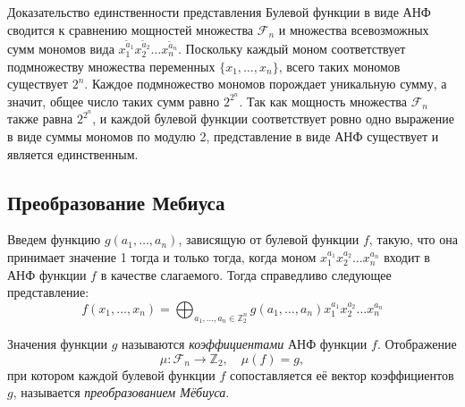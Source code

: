Доказательство единственности представления Булевой функции в виде АНФ сводится к сравнению мощностей множества $\mathcal{F}_n$ и множества всевозможных сумм мономов вида $x_1^{\tilde{a}_1}x_2^{\tilde{a}_2}\dots x_n^{\tilde{a}_n}$. Поскольку каждый моном соответствует подмножеству множества переменных $\{x_1,…,x_n\}$, всего таких мономов существует $2^n$. Каждое подмножество мономов порождает уникальную сумму, а значит, общее число таких сумм равно $2^{2^n}$.
Так как мощность множества $\mathcal{F}_n$  также равна $2^{2^n}$, и каждой булевой функции соответствует ровно одно выражение в виде суммы мономов по модулю 2, представление в виде АНФ существует и является единственным.
\subsection{Преобразование Мебиуса}
Введем функцию $g(a_1,\dots,a_n)$, зависящую от булевой функции $f$, такую, что она принимает значение 1 тогда и только тогда, когда моном $x_1^{a_1}x_2^{a_2}\dots x_n^{a_n}$ входит в АНФ функции $f$ в качестве слагаемого. Тогда справедливо следующее представление:
\begin{equation}
    f(x_1, \dots, x_n) = \bigoplus_{a_1, \dots, a_n \in \mathbb{Z}_2^n}g(a_1,\dots,a_n)x_1^{a_1}x_2^{a_2}\dots x_n^{a_n}
    \label{3}
\end{equation}

Значения функции $g$ называются \textit{коэффициентами} АНФ функции $f$. Отображение
\[
\mu:\mathcal{F}_n \rightarrow \mathbb{Z}_2,\quad \mu(f) = g,
\]
при котором каждой булевой функции $f$ сопоставляется её вектор коэффициентов $g$, называется \textit{преобразованием Мёбиуса}.

